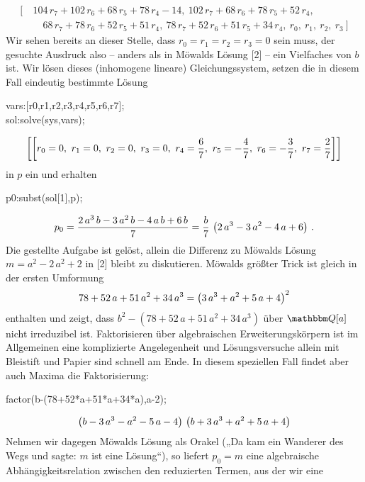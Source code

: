 \documentclass[11pt,a4paper]{article}
\newcommand{\cas}[1]{{\sc #1}}
\begin{document}
\begin{align*}
  \big[\ &
    104\,r_7+102\,r_6+68\,r_5+78\,r_4-14,\ 102\,r_7+68\,r_6+78\,r_5+52\,r_4,\\ &\quad
    68\,r_7+78\,r_6+52\,r_5+51\,r_4,\ 78\,r_7+52\,r_6+51\,r_5+34\,r_4,\ r_0,\ r_1,\ r_2,\ r_3\ \big]
\end{align*}
Wir sehen bereits an dieser Stelle, dass $r_0=r_1=r_2=r_3=0$ sein muss, der
gesuchte Ausdruck also -- anders als in Möwalds Lösung [2] -- ein Vielfaches
von $b$ ist. Wir lösen dieses (inhomogene lineare) Gleichungssystem, setzen die
in diesem Fall eindeutig bestimmte Lösung
\begin{code}
vars:[r0,r1,r2,r3,r4,r5,r6,r7];\\
sol:solve(sys,vars);  
\end{code}
\begin{gather*}
  \left[\left[r_0 = 0,\ r_1 = 0,\ r_2 = 0,\ r_3 = 0,\ r_4 = \frac67,\ r_5 =
      -\frac47,\ r_6 = -\frac37,\ r_7 = \frac27\right]\right]
\end{gather*}
in $p$ ein und erhalten 
\begin{code}
  p0:subst(sol[1],p);
\end{code}
\begin{gather*}
  p_0=\frac{2\,a^3\,b-3\,a^2\,b-4\,a\,b+6\,b}{7}=\frac{b}{7}\,\left(2\,a^3-3\,a^2-4\,a+6\right)\,.
\end{gather*}
Die gestellte Aufgabe ist gelöst, allein die Differenz zu Möwalds Lösung
$m=a^2-2\,a^2+2$ in [2] bleibt zu diskutieren.  Möwalds größter Trick ist
gleich in der ersten Umformung
\begin{gather*}
  78+52\,a+51\,a^2+34\,a^3=\left(3\,a^3+a^2+5\,a+4\right)^2
\end{gather*}
enthalten und zeigt, dass $b^2-(78+52\,a+51\,a^2+34\,a^3)$ über $\Q[a]$ nicht
irreduzibel ist. Faktorisieren über algebraischen Erweiterungskörpern ist im
Allgemeinen eine komplizierte Angelegenheit und Lösungsversuche allein mit
Bleistift und Papier sind schnell am Ende. In diesem speziellen Fall findet
aber auch \cas{Maxima} die Faktorisierung:
\begin{code}
  factor(b-(78+52*a+51*a+34*a),a-2);
\end{code}
\begin{gather*}
  \left(b-3\,a^3-a^2-5\,a-4\right)\,\left(b+3\,a^3+a^2+5\,a+4\right)
\end{gather*}
Nehmen wir dagegen Möwalds Lösung als Orakel („Da kam ein Wanderer des Wegs und
sagte: $m$ ist eine Lösung“), so liefert $p_0=m$ eine algebraische
Abhängigkeitsrelation zwischen den reduzierten Termen, aus der wir eine
\end{document}
